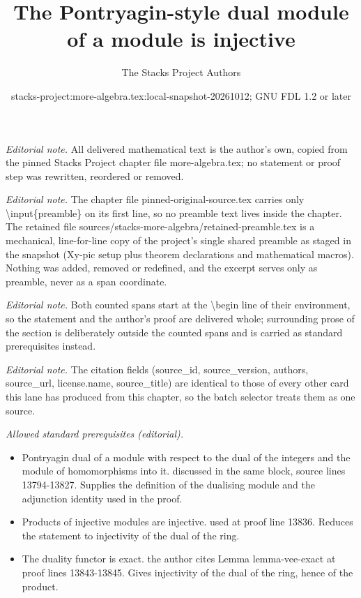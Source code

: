 \documentclass[10pt,a4paper]{amsart}
\title{The Pontryagin-style dual module of a module is injective}
\author{The Stacks Project Authors}
\date{stacks-project:more-algebra.tex:local-snapshot-20261012; GNU FDL 1.2 or later}
\theoremstyle{plain}
\theoremstyle{definition}
\theoremstyle{remark}
\numberwithin{equation}{subsection}
\begin{document}
\maketitle
\setcounter{subsection}{1}
\noindent\textit{Editorial note.} All delivered mathematical text is the author's own, copied from the pinned Stacks Project chapter file more-algebra.tex; no statement or proof step was rewritten, reordered or removed.\par\medskip
\noindent\textit{Editorial note.} The chapter file pinned-original-source.tex carries only \textbackslash{}input\{preamble\} on its first line, so no preamble text lives inside the chapter. The retained file sources/stacks-more-algebra/retained-preamble.tex is a mechanical, line-for-line copy of the project's single shared preamble as staged in the snapshot (Xy-pic setup plus theorem declarations and mathematical macros). Nothing was added, removed or redefined, and the excerpt serves only as preamble, never as a span coordinate.\par\medskip
\noindent\textit{Editorial note.} Both counted spans start at the \textbackslash{}begin line of their environment, so the statement and the author's proof are delivered whole; surrounding prose of the section is deliberately outside the counted spans and is carried as standard prerequisites instead.\par\medskip
\noindent\textit{Editorial note.} The citation fields (source\_id, source\_version, authors, source\_url, license.name, source\_title) are identical to those of every other card this lane has produced from this chapter, so the batch selector treats them as one source.\par\medskip
\noindent\textit{Allowed standard prerequisites (editorial).}\begin{itemize}
\item Pontryagin dual of a module with respect to the dual of the integers and the module of homomorphisms into it. discussed in the same block, source lines 13794-13827. Supplies the definition of the dualising module and the adjunction identity used in the proof.
\item Products of injective modules are injective. used at proof line 13836. Reduces the statement to injectivity of the dual of the ring.
\item The duality functor is exact. the author cites Lemma lemma-vee-exact at proof lines 13843-13845. Gives injectivity of the dual of the ring, hence of the product.
\end{itemize}\medskip
\end{document}
